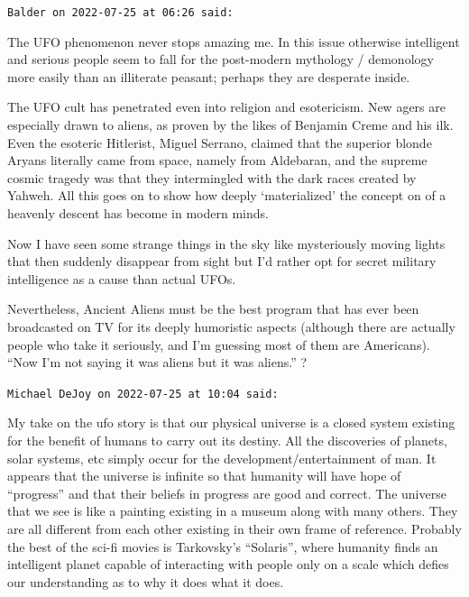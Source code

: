 \begin{footnotesize}
\begin{sffamily}
\texttt{Balder on 2022-07-25 at 06:26 said:}

The UFO phenomenon never stops amazing me. In this issue otherwise intelligent and serious people seem to fall for the post-modern mythology / demonology more easily than an illiterate peasant; perhaps they are desperate inside.

The UFO cult has penetrated even into religion and esotericism. New agers are especially drawn to aliens, as proven by the likes of Benjamin Creme and his ilk. Even the esoteric Hitlerist, Miguel Serrano, claimed that the superior blonde Aryans literally came from space, namely from Aldebaran, and the supreme cosmic tragedy was that they intermingled with the dark races created by Yahweh. All this goes on to show how deeply `materialized' the concept on of a heavenly descent has become in modern minds.

Now I have seen some strange things in the sky like mysteriously moving lights that then suddenly disappear from sight but I'd rather opt for secret military intelligence as a cause than actual UFOs.

Nevertheless, Ancient Aliens must be the best program that has ever been broadcasted on TV for its deeply humoristic aspects (although there are actually people who take it seriously, and I'm guessing most of them are Americans). ``Now I'm not saying it was aliens but it was aliens.'' ?

\hfill

\texttt{Michael DeJoy on 2022-07-25 at 10:04 said:}

My take on the ufo story is that our physical universe is a closed system existing for the benefit of humans to carry out its destiny. All the discoveries of planets, solar systems, etc simply occur for the development/entertainment of man. It appears that the universe is infinite so that humanity will have hope of ``progress'' and that their beliefs in progress are good and correct. The universe that we see is like a painting existing in a museum along with many others. They are all different from each other existing in their own frame of reference. Probably the best of the sci-fi movies is Tarkovsky's ``Solaris'', where humanity finds an intelligent planet capable of interacting with people only on a scale which defies our understanding as to why it does what it does.

\hfill


\end{sffamily}
\end{footnotesize}
